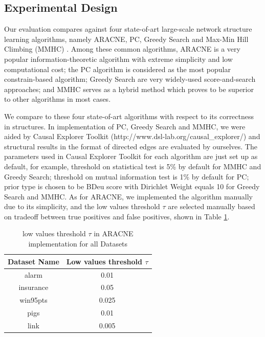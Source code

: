 \subsection{Experimental Design}
\label{exp:expDesign}

Our evaluation compares \lama{} against four state-of-art
large-scale network structure learning algorithms, namely
ARACNE\cite{DBLP:journals/bmcbi/MargolinNBWSFC06}, PC\cite{Spirtes2000},
Greedy Search\cite{Brown05acomparison} and Max-Min Hill Climbing (MMHC)
\cite{Tsamardinos06themax-min}. Among these common algorithms,
ARACNE\cite{DBLP:journals/bmcbi/MargolinNBWSFC06} is a very popular
information-theoretic algorithm with extreme simplicity and low
computational cost; the PC algorithm\cite{Spirtes2000} is considered
as the most popular constrain-based algorithm; Greedy Search\cite{Brown05acomparison} are very widely-used score-and-search approaches; and MMHC\cite{Tsamardinos06themax-min} serves as a hybrid method which proves to be superior to other algorithms in most cases.

We compare \lama{} to these four state-of-art algorithms with respect to its correctness in structures. In implementation of PC, Greedy Search and MMHC, we were aided by Causal Explorer Toolkit\cite{CasualExplorer} (http://www.dsl-lab.org/causal\_explorer/) and structural results in the format of directed edges are evaluated by ourselves. The parameters used in Causal Explorer Toolkit for each algorithm are just set up as default, for example, threshold on statistical test is 5\% by default for MMHC and Greedy Search; threshold on mutual information test is 1\% by default for PC; prior type is chosen to be BDeu score\cite{Buntine91theoryrefinement} with Dirichlet Weight equals 10 for Greedy Search and MMHC. As for ARACNE, we implemented the algorithm manually due to its simplicity, and the low values threshold $\tau$ are selected manually based on tradeoff between true positives and false positives, shown in Table \ref{tab:aracneParam}.

\begin{table}[th]
\begin{center}
\caption{\label{tab:aracneParam}low values threshold $\tau$ in ARACNE implementation for all Datasets}
\small
\begin{tabular}{|c|c|}
\hline
Dataset Name & Low values threshold $\tau$ \\
\hline
alarm     & 0.01  \\
insurance & 0.05  \\
win95pts  & 0.025 \\
pigs      & 0.01  \\
link      & 0.005 \\
\hline
\end{tabular}
\end{center}
\end{table}

